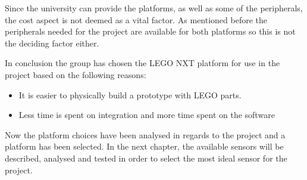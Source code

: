 Since the university can provide the platforms, as well as some of the
peripherals, the cost aspect is not deemed as a vital factor. As mentioned
before the peripherals needed for the project are available for both platforms
so this is not the deciding factor either.\nl

In conclusion the group has chosen the LEGO NXT platform for use in the project
based on the following reasons:
\begin{itemize}
  \item It is easier to physically build a prototype with LEGO parts.
  \item Less time is spent on integration and more time spent on the software
\end{itemize}

Now the platform choices have been analysed in regards to the project and a
platform has been selected. In the next chapter, the available sensors will be
described, analysed and tested in order to select the most ideal sensor for the
project.
